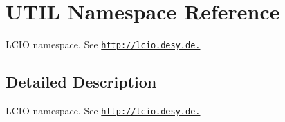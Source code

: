 \hypertarget{namespace_u_t_i_l}{
\section{UTIL Namespace Reference}
\label{namespace_u_t_i_l}
}


LCIO namespace. See \href{http://lcio.desy.de.}{\tt http://lcio.desy.de.}  


\subsection{Detailed Description}
LCIO namespace. See \href{http://lcio.desy.de.}{\tt http://lcio.desy.de.} 